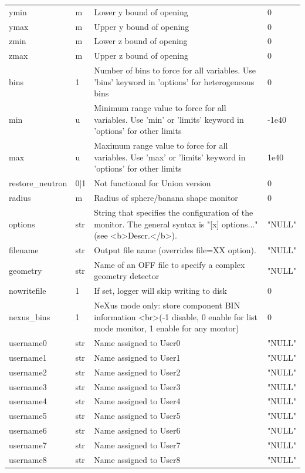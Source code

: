 \begin{longtable}{p{}p{}p{}p{}}
ymin & m & Lower y bound of opening & 0 \\
ymax & m & Upper y bound of opening & 0 \\
zmin & m & Lower z bound of opening & 0 \\
zmax & m & Upper z bound of opening & 0 \\
bins & 1 & Number of bins to force for all variables. Use 'bins' keyword in 'options' for heterogeneous bins & 0 \\
min & u & Minimum range value to force for all variables. Use 'min' or 'limits' keyword in 'options' for other limits & -1e40 \\
max & u & Maximum range value to force for all variables. Use 'max' or 'limits' keyword in 'options' for other limits & 1e40 \\
restore\_neutron & 0|1 & Not functional for Union version & 0 \\
radius & m & Radius of sphere/banana shape monitor & 0 \\
options & str & String that specifies the configuration of the monitor. The general syntax is "[x] options..." (see \textless{}b\textgreater{}Descr.\textless{}/b\textgreater{}). & "NULL" \\
filename & str & Output file name (overrides file=XX option). & "NULL" \\
geometry & str & Name of an OFF file to specify a complex geometry detector & "NULL" \\
nowritefile & 1 & If set, logger will skip writing to disk & 0 \\
nexus\_bins & 1 & NeXus mode only: store component BIN information \textless{}br\textgreater{}(-1 disable, 0 enable for list mode monitor, 1 enable for any montor) & 0 \\
username0 & str & Name assigned to User0 & "NULL" \\
username1 & str & Name assigned to User1 & "NULL" \\
username2 & str & Name assigned to User2 & "NULL" \\
username3 & str & Name assigned to User3 & "NULL" \\
username4 & str & Name assigned to User4 & "NULL" \\
username5 & str & Name assigned to User5 & "NULL" \\
username6 & str & Name assigned to User6 & "NULL" \\
username7 & str & Name assigned to User7 & "NULL" \\
username8 & str & Name assigned to User8 & "NULL" \\

\end{longtable}
